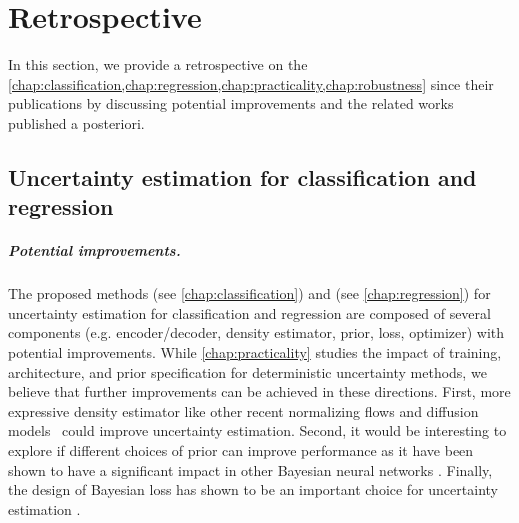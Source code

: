 \chapter{Retrospective}
\label{chap:retrospective_1}


In this section, we provide a retrospective on the \cref{chap:classification,chap:regression,chap:practicality,chap:robustness} since their publications by discussing potential improvements and the related works published a posteriori.

\section{Uncertainty estimation for classification and regression} 

\paragraph{Potential improvements.} The proposed methods \PostNetacro{} (see \cref{chap:classification}) and \NatPNacro{} (see \cref{chap:regression}) for uncertainty estimation for classification and regression are composed of several components (e.g. encoder/decoder, density estimator, prior, loss, optimizer) with potential improvements. While \cref{chap:practicality} studies the impact of training, architecture, and prior specification for deterministic uncertainty methods, we believe that further improvements can be achieved in these directions. First, more expressive density estimator like other recent normalizing flows \cite{nf-review} and diffusion models \cite{variationaldiffussion2022kingma} could improve uncertainty estimation. Second, it would be interesting to explore if different choices of prior can improve performance as it have been shown to have a significant impact in other Bayesian neural networks \cite{bayesposterior2020wenzel, coldaleatoric2020adlam}. Finally, the design of Bayesian loss has shown to be an important choice for uncertainty estimation \cite{bengs2022pitfalls}.

